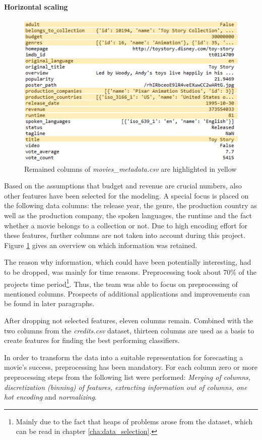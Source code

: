 \paragraph{Horizontal scaling}
\begin{figure}
	\includegraphics[width=0.6 \textwidth]{images/3_metadata_columns.png}
	\caption{Remained columns of \textit{movies\_metadata.csv} are highlighted in yellow}
	\label{img:mm_columns}
\end{figure}

Based on the assumptions that budget and revenue are crucial numbers, also other features have been selected for the modeling. A special focus is placed on the following data columns: the release year, the genre, the production country as well as the production company, the spoken languages, the runtime and the fact whether a movie belongs to a collection or not. Due to high encoding effort for these features, further columns are not taken into account during this project. Figure \ref{img:mm_columns} gives an overview on which information was retained.

The reason why information, which could have been potentially interesting, had to be dropped, was mainly for time reasons. Preprocessing took about 70\% of the projects time period\footnote{Mainly due to the fact that heaps of problems arose from the dataset, which can be read in chapter \ref{cha:data_selection}.}. Thus, the team was able to focus on preprocessing of mentioned columns. Prospects of additional applications and improvements can be found in later paragraphs.

After dropping not selected features, eleven columns remain. Combined with the two columns from the \textit{credits.csv} dataset, thirteen columns are used as a basis to create features for finding the best performing classifiers.

In order to transform the data into a suitable representation for forecasting a movie's success, preprocessing has been mandatory. For each column zero or more preprocessing steps from the following list were performed: \textit{Merging of columns, discretization (binning) of features, extracting information out of columns, one hot encoding} and \textit{normalizing}.

